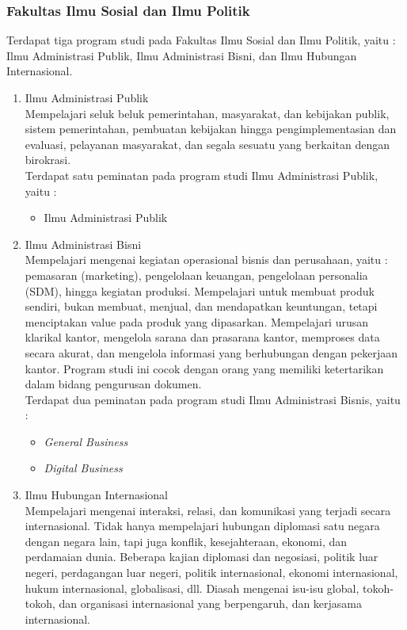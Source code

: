 \subsubsection{Fakultas Ilmu Sosial dan Ilmu Politik}
Terdapat tiga program studi pada Fakultas Ilmu Sosial dan Ilmu Politik, yaitu : Ilmu Administrasi Publik, Ilmu Administrasi Bisni, dan Ilmu Hubungan Internasional.
	\begin{enumerate}
		\item Ilmu Administrasi Publik\\
			Mempelajari seluk beluk pemerintahan, masyarakat, dan kebijakan
publik, sistem pemerintahan, pembuatan kebijakan hingga pengimplementasian dan evaluasi, pelayanan masyarakat, dan segala sesuatu yang berkaitan dengan birokrasi.\\

			Terdapat satu peminatan pada program studi Ilmu Administrasi Publik, yaitu :
			
			\begin{itemize}
				\item Ilmu Administrasi Publik
			\end{itemize}\leavevmode
			
		\item Ilmu Administrasi Bisni\\
			Mempelajari mengenai kegiatan operasional bisnis dan perusahaan,
yaitu : pemasaran (marketing), pengelolaan keuangan, pengelolaan personalia (SDM), hingga kegiatan produksi. Mempelajari untuk membuat produk sendiri, bukan membuat, menjual, dan mendapatkan keuntungan, tetapi menciptakan value pada produk yang dipasarkan. Mempelajari urusan klarikal kantor, mengelola sarana dan prasarana kantor, memproses data secara akurat, dan mengelola informasi yang berhubungan dengan pekerjaan kantor. Program studi ini cocok dengan orang yang memiliki ketertarikan dalam bidang pengurusan dokumen.\\
			
			Terdapat dua peminatan pada program studi Ilmu Administrasi Bisnis, yaitu :
			
			\begin{itemize}
				\item \textit{General Business}
				\item \textit{Digital Business}
			\end{itemize}\leavevmode
						
		\item Ilmu Hubungan Internasional\\
			Mempelajari mengenai interaksi, relasi, dan komunikasi yang terjadi secara internasional. Tidak hanya mempelajari hubungan diplomasi satu negara dengan negara lain, tapi juga konflik, kesejahteraan, ekonomi, dan perdamaian dunia. Beberapa kajian diplomasi dan negosiasi, politik luar negeri, perdagangan luar negeri, politik internasional, ekonomi internasional, hukum internasional, globalisasi, dll. Diasah mengenai isu-isu global, tokoh-tokoh, dan organisasi internasional yang berpengaruh, dan kerjasama internasional.\\
			

\end{enumerate}
